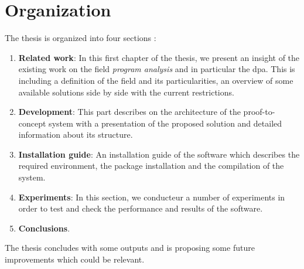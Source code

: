\section{Organization}
The thesis is organized into four sections :
\begin{enumerate}
  \item \textbf{Related work}: In this first chapter of the thesis, we present an insight of the existing work on the field \textit{program analysis} and in particular the \gls{dpa}. This is including a definition of the field and its particularities, an overview of some available solutions side by side with the current restrictions.
  \item \textbf{Development}: This part describes on the architecture of the proof-to-concept system with a presentation of the proposed solution and detailed information about its structure.
  \item \textbf{Installation guide}: An installation guide of the software which describes the required environment, the package installation and the compilation of the system.
  \item \textbf{Experiments}: In this section, we conducteur a number of experiments in order to test and check the performance and results of the software.
  \item \textbf{Conclusions}.
\end{enumerate}
The thesis concludes with some outputs and is proposing some future improvements which could be relevant.

